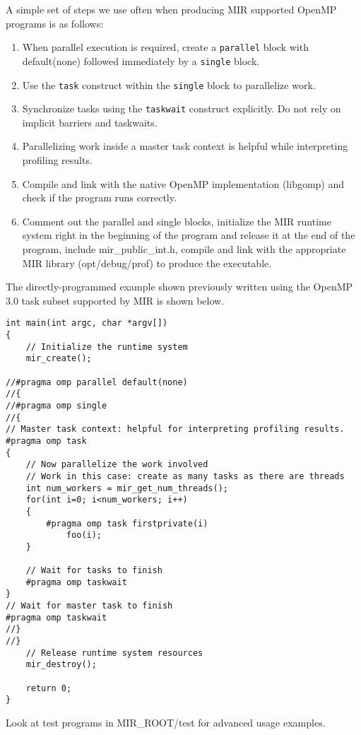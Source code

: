 \documentclass[11pt,a4paper,notitlepage]{article}
\begin{document}
A simple set of steps we use often when producing MIR supported OpenMP programs is as follows:
\begin{enumerate}
\item When parallel execution is required, create a \texttt{parallel} block  with default(none) followed immediately by a \texttt{single} block. 
\item Use the \texttt{task} construct within the \texttt{single} block to parallelize work. 
\item Synchronize tasks using the \texttt{taskwait} construct explicitly. Do not rely on implicit barriers and taskwaits.
\item Parallelizing work inside a master task context is helpful while interpreting profiling results.
\item Compile and link with the native OpenMP implementation (libgomp) and check if the program runs correctly. 
\item Comment out the parallel and single blocks, initialize the MIR runtime system right in the beginning of the program and release it at the end of the program, include mir\_public\_int.h, compile and link with the appropriate MIR library (opt/debug/prof) to produce the executable.
\end{enumerate}

The directly-programmed example shown previously written using the OpenMP 3.0 task subset supported by MIR is shown below.

\begin{lstlisting}[style=BashInputStyle]
int main(int argc, char *argv[])
{
    // Initialize the runtime system
    mir_create();

//#pragma omp parallel default(none)
//{
//#pragma omp single
//{
// Master task context: helpful for interpreting profiling results.
#pragma omp task
{
    // Now parallelize the work involved
    // Work in this case: create as many tasks as there are threads
    int num_workers = mir_get_num_threads();
    for(int i=0; i<num_workers; i++)
    {
        #pragma omp task firstprivate(i)
            foo(i);
    }
        
    // Wait for tasks to finish
    #pragma omp taskwait
}
// Wait for master task to finish
#pragma omp taskwait
//}
//}
    // Release runtime system resources
    mir_destroy();

    return 0;
}
\end{lstlisting}

Look at test programs in MIR\_ROOT/test for advanced usage examples.
\end{document}
